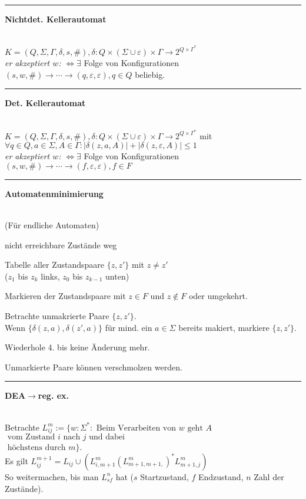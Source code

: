 \documentclass{article}
\newcommand{\hh}[1]{{\vspace{1pt}\hrule\vspace{1pt} \noindent\textbf{#1}}\\}
\newcommand{\hhh}[1]{{\vspace{1pt}\noindent\emph{#1:}}}
\newcounter{Lcount}
\newenvironment{tightenum}{
\begin{list}{\arabic{Lcount}.}{
\usecounter{Lcount}
\setlength{\topsep}{-1ex}
\setlength{\itemsep}{-1ex}
\setlength{\leftmargin}{4ex}}
}{
\end{list}
\vspace{1ex}
}
\begin{document}
\begin{multicols}{4}
\hh{Nichtdet. Kellerautomat}
$K=(Q, \Sigma, \Gamma, \delta, s, \#), \delta: Q\times(\Sigma\cup\varepsilon)\times\Gamma\to 2^{Q\times\Gamma^*}$\\
\hhh{er akzeptiert $w$} $\Leftrightarrow\exists$ Folge von Konfigurationen $(s, w, \#)\to\cdots\to(q, \varepsilon, \varepsilon), q\in Q$ beliebig.\\
\hh{Det. Kellerautomat}
$K=(Q, \Sigma, \Gamma, \delta, s, \#), \delta: Q\times(\Sigma\cup\varepsilon)\times\Gamma\to 2^{Q\times\Gamma^*}$ mit $\forall q\in Q, a\in\Sigma, A\in\Gamma:|\delta(z, a, A)|+|\delta(z, \varepsilon, A)|\le 1$\\
\hhh{er akzeptiert $w$} $\Leftrightarrow\exists$ Folge von Konfigurationen $(s, w, \#)\to\cdots\to(f, \varepsilon, \varepsilon), f\in F$\\
\hh{Automatenminimierung}
(Für endliche Automaten)
\begin{tightenum}
\item nicht erreichbare Zustände weg \\
\item Tabelle aller Zustandspaare $\{z,z'\}$ mit $z \neq z'$ \\
($z_1$ bis $z_k$ links, $z_0$ bis $z_{k-1}$ unten) \\
\item Markieren der Zustandspaare mit $z \in F$ und $z \notin F$ oder umgekehrt. \\
\item Betrachte unmakrierte Paare $\{z,z'\}$. \\
Wenn $\{\delta(z,a),\delta(z',a)\}$ für mind. ein $a \in \Sigma$ bereits makiert, markiere $\{z,z'\}$. \\
\item Wiederhole 4. bis keine Änderung mehr. \\
\item Unmarkierte Paare können verschmolzen werden. \\ 
\end{tightenum}

\hh{DEA$\to$reg. ex.}

Betrachte $L_{ij}^m := \{w:\Sigma^*:\text{ Beim Verarbeiten von $w$ geht $A$}$\\$\text{ vom Zustand $i$ nach $j$ und dabei}$\\$\text{ höchstens durch $m$}\}$.\\
Es gilt $L_{ij}^{m+1} = L_{ij}\cup\left( L_{i,m+1}^m (L_{m+1,m+1,}^m)^* L_{m+1,j}^m\right)$\\
So weitermachen, bis man $L_{sf}^n$ hat ($s$ Startzustand, $f$ Endzustand, $n$ Zahl der Zustände).


\end{multicols}
\end{document}
